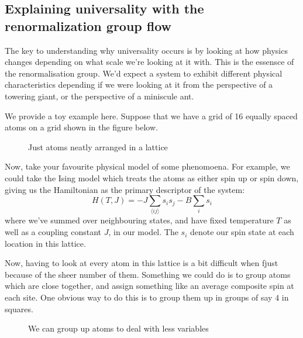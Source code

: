 \documentclass[11pt, oneside]{article}   	%
\begin{document}
\subsection{Explaining universality with the renormalization group flow} 
The key to understanding why universality occurs is by looking at how physics changes depending on what scale we're looking at it with. This is the essensce of the renormalisation group. We'd expect a system to exhibit different physical characteristics depending if we were looking at it from the perspective of a towering giant, or the perspective of a miniscule ant.  

We provide a toy example here. Suppose that we have a grid of 16 equally spaced atoms on a grid shown in the figure below. 
\begin{figure}[!h] 
	\centering 
{}
	\caption{Just atoms neatly arranged in a lattice} 
	\label{fig:atomLattice}  
\end{figure} 
Now, take your favourite physical model of some phenomoena. For example, we could take the Ising model which treats the atoms as either spin up or spin down, giving us the Hamiltonian as the primary descriptor of the system: 
\[ H(T, J ) =  - J \sum_{ \langle ij \rangle } s_i s_j  - B \sum_i s_i \] 
where we've summed over neighbouring states, and have fixed temperature $T$ as well as a coupling constant $J$, in our model. The $s_i$ denote our spin state at each location in this lattice. 

Now, having to look at every atom in this lattice is a bit difficult when fjust because of the sheer number of them. Something we could do is to group atoms which are close together, and assign something like an average composite spin at each site. One obvious way to do this is to group them up in groups of say $4$ in squares. 

\begin{figure}[!h] 
	\centering 
{}
	\qquad
{}
	
\caption{We can group up atoms to deal with less variables} 
	\label{fig:renormToy}  
\end{figure} 
\end{document}

